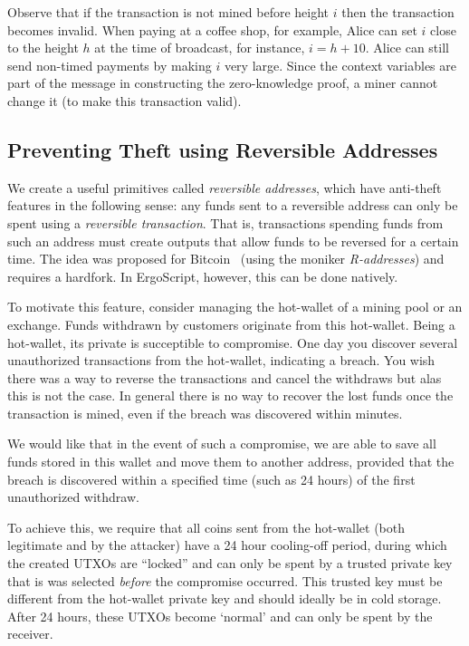 \documentclass[11pt]{article}
\newcommand{\langname}{ErgoScript\xspace}
\begin{document}
Observe that if the transaction is not mined before height $i$ then the transaction becomes invalid. When paying at a coffee shop, for example, Alice can set $i$ close to the height $h$ at the time of broadcast, for instance, $i = h + 10$. 
Alice can still send non-timed payments by making $i$ very large. Since the context variables are part of the message in constructing the zero-knowledge proof, a miner cannot change it (to make this transaction valid). 

\subsection{Preventing Theft using Reversible Addresses}

We create a useful primitives called {\em reversible addresses}, which have anti-theft features in the following sense:
any funds sent to a reversible address can only be spent using a {\em reversible transaction}. That is, transactions spending funds from such an address must create outputs that allow funds to be reversed for a certain time. The idea was proposed for Bitcoin~\cite{raddress} (using the moniker {\em R-addresses}) and requires a hardfork. In \langname, however, this can be done natively.

To motivate this feature, consider managing the hot-wallet of a mining pool or an exchange. Funds withdrawn by customers originate from this hot-wallet. Being a hot-wallet, its private is succeptible to compromise. One day you discover several unauthorized transactions from the hot-wallet, indicating a breach. You wish there was a way to reverse the transactions and cancel the withdraws but alas this is not the case. In general there is no way to recover the lost funds once the transaction is mined, even if the breach was discovered within minutes. 

We would like that in the event of such a compromise, we are able to save all funds stored in this wallet and move them to another address, provided that the breach is discovered within a specified time (such as 24 hours) of the first unauthorized withdraw. 

To achieve this, we require that all coins sent from the hot-wallet (both legitimate and by the attacker)
have a 24 hour cooling-off period, during which the created UTXOs are ``locked'' and can only be spent by a trusted private key that is was selected {\em before} the compromise occurred. This trusted key must be different from the hot-wallet private key and should ideally be in cold storage. 
After 24 hours, these UTXOs become `normal' and can only be spent by the receiver.
\end{document}
